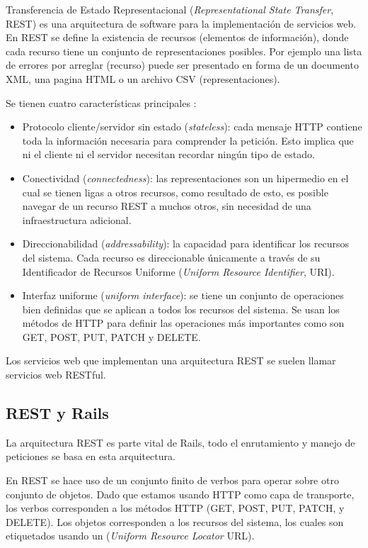 Transferencia de Estado Representacional (\textit{Representational State Transfer}, REST) es una arquitectura de software para la implementación de servicios web.
En REST se define la existencia de recursos (elementos de información), donde
cada recurso tiene un conjunto de representaciones posibles.
Por ejemplo una lista de errores por arreglar (recurso) puede ser presentado en
forma de un documento XML, una pagina HTML o un archivo CSV (representaciones).

\vspace{2.5mm}

Se tienen cuatro características principales \cite{1_richardson_2007}:

\begin{itemize}
\item Protocolo cliente/servidor sin estado (\textit{stateless}): cada mensaje
  HTTP contiene toda la información necesaria para comprender la petición.
  Esto implica que ni el cliente ni el servidor necesitan recordar ningún
  tipo de estado.
\item Conectividad (\textit{connectedness}): las representaciones son un hipermedio
  en el cual se tienen ligas a otros recursos, como resultado de esto, es posible
  navegar de un recurso REST a muchos otros, sin necesidad de una
  infraestructura adicional.
\item Direccionabilidad (\textit{addressability}): la capacidad para
  identificar los recursos del sistema. Cada recurso es direccionable únicamente
  a través de su Identificador de Recursos Uniforme (\textit{Uniform Resource Identifier}, URI).
\item Interfaz uniforme (\textit{uniform interface}): se tiene un conjunto de
  operaciones bien definidas que se aplican a todos los recursos del sistema.
  Se usan los métodos de HTTP para definir las operaciones más importantes
  como son GET, POST, PUT, PATCH y DELETE.
\end{itemize}

Los servicios web que implementan una arquitectura REST se suelen llamar
servicios web RESTful.

\subsection{REST y Rails}

La arquitectura REST es parte vital de Rails, todo el enrutamiento y
manejo de peticiones se basa en esta arquitectura.

En REST se hace uso de un conjunto finito de verbos para operar sobre otro
conjunto de objetos. Dado que estamos usando HTTP como capa de transporte, los
verbos corresponden a los métodos HTTP (GET, POST, PUT, PATCH, y DELETE).
Los objetos corresponden a los recursos del sistema, los cuales son etiquetados
usando un (\textit{Uniform Resource Locator} URL).

